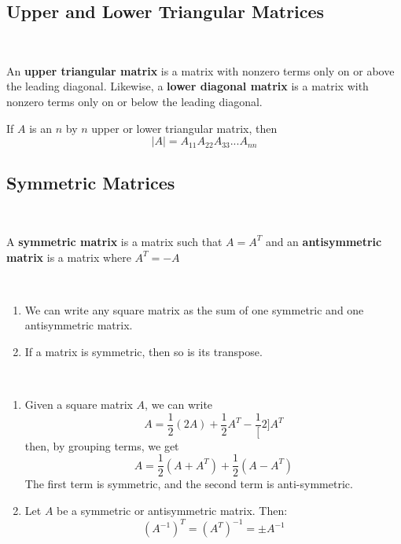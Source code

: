\documentclass{article}
\begin{document}
\subsection{Upper and Lower Triangular Matrices}
\ 
\begin{definition}
An \textbf{upper triangular matrix} is a matrix with nonzero terms only on or above the leading diagonal. Likewise, a \textbf{lower diagonal matrix} is a matrix with nonzero terms only on or below the leading diagonal.  
\end{definition}

\begin{proposition}
If $A$ is an $n$ by $n$ upper or lower triangular matrix, then $$\vert A\vert = A_{11}A_{22}A_{33}...A_{nn}$$  
\end{proposition}

\subsection{Symmetric Matrices}
\ 
\begin{definition}
A \textbf{symmetric matrix} is a matrix such that $A = A^T$ and an \textbf{antisymmetric matrix} is a matrix where $A^T = -A$   
\end{definition}

\begin{proposition}
\ 
\begin{enumerate}
    \item We can write any square matrix as the sum of one symmetric and one antisymmetric matrix.  
    \item If a matrix is symmetric, then so is its transpose. 
\end{enumerate}
\end{proposition}

\begin{customproof}
    \   
\begin{enumerate}
    \item Given a square matrix $A$, we can write $$A = \frac{1}{2}(2A) + \frac{1}{2}A^T - \frac{1}[2]A^T$$then, by grouping terms, we get$$A = \frac{1}{2}(A+A^T) + \frac{1}{2}(A - A^T)$$The first term is symmetric, and the second term is anti-symmetric.
    \item Let $A$ be a symmetric or antisymmetric matrix. Then: $$(A ^{-1})^T = (A^T) ^{-1} = \pm A ^{-1} $$
\end{enumerate}
\end{customproof}
\end{document}

